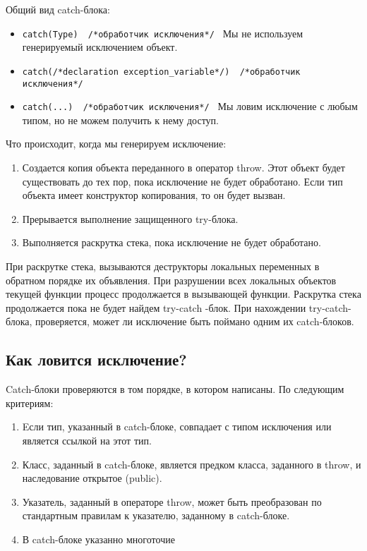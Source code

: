 Общий вид catch-блока:
\begin{itemize}
    \item
    \texttt{catch(Type) { /*обработчик исключения*/ }}
    Мы не используем генерируемый исключением объект.
    \item
    \texttt{catch(/*declaration exception_variable*/) { /*обработчик исключения*/ }}
    \item
    \texttt{catch(...) { /*обработчик исключения*/ }}
    Мы ловим исключение с любым типом, но не можем получить к нему доступ.
\end{itemize}

Что происходит, когда мы генерируем исключение:
\begin{enumerate}
    \item
    Создается копия объекта переданного в оператор throw. Этот объект будет существовать до тех пор, пока исключение не будет обработано. Если тип объекта имеет конструктор копирования, то он будет вызван.
    \item
    Прерывается выполнение защищенного try-блока.
    \item
    Выполняется раскрутка стека, пока исключение не будет обработано.
\end{enumerate}

При раскрутке стека, вызываются деструкторы локальных переменных в обратном порядке их объявления. При разрушении всех локальных объектов текущей функции процесс продолжается в вызывающей функции. Раскрутка стека продолжается пока не будет найдем try-catch -блок. При нахождении try-catch-блока, проверяется, может ли исключение быть поймано одним их catch-блоков.

\subsection{Как ловится исключение?}

Catch-блоки проверяются в том порядке, в котором написаны. По следующим критериям:
\begin{enumerate}
    \item
    Eсли тип, указанный в catch-блоке, совпадает с типом исключения или является ссылкой на этот тип.
    \item
    Класс, заданный в catch-блоке, является предком класса, заданного в throw, и наследование открытое (public).
    \item
    Указатель, заданный в операторе throw, может быть преобразован по стандартным правилам к указателю, заданному в catch-блоке.
    \item
    В catch-блоке указанно многоточие
\end{enumerate}

